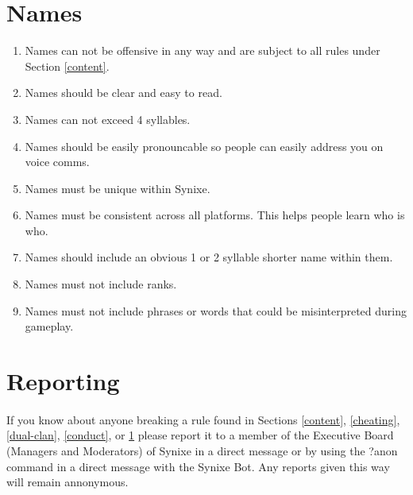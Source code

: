 \documentclass[10pt,a4paper]{article}
\begin{document}
\section{Names} \label{names}
\begin{enumerate}
	\item Names can not be offensive in any way and are subject to all rules under Section \ref{content}.
	\item Names should be clear and easy to read.
	\item Names can not exceed 4 syllables.
	\item Names should be easily pronouncable so people can easily address you on voice comms.
	\item Names must be unique within Synixe.
	\item Names must be consistent across all platforms. This helps people learn who is who.
	\item Names should include an obvious 1 or 2 syllable shorter name within them.
	\item Names must not include ranks.
	\item Names must not include phrases or words that could be misinterpreted during gameplay.
\end{enumerate}
\section{Reporting}
\paragraph{}
If you know about anyone breaking a rule found in Sections \ref{content}, \ref{cheating}, \ref{dual-clan}, \ref{conduct}, or \ref{names} please report it to a member of the Executive Board (Managers and Moderators) of Synixe in a direct message or by using the ?anon command in a direct message with the Synixe Bot. Any reports given this way will remain annonymous.
\end{document}
